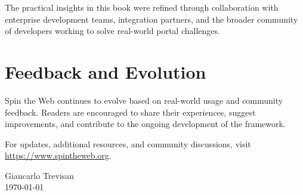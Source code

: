 The practical insights in this book were refined through collaboration with enterprise development teams, integration partners, and the broader community of developers working to solve real-world portal challenges.

\section*{Feedback and Evolution}

Spin the Web continues to evolve based on real-world usage and community feedback. Readers are encouraged to share their experiences, suggest improvements, and contribute to the ongoing development of the framework.

For updates, additional resources, and community discussions, visit \url{https://www.spintheweb.org}.

\vspace{1cm}
\hfill Giancarlo Trevisan \\
\hfill \today

\clearpage
